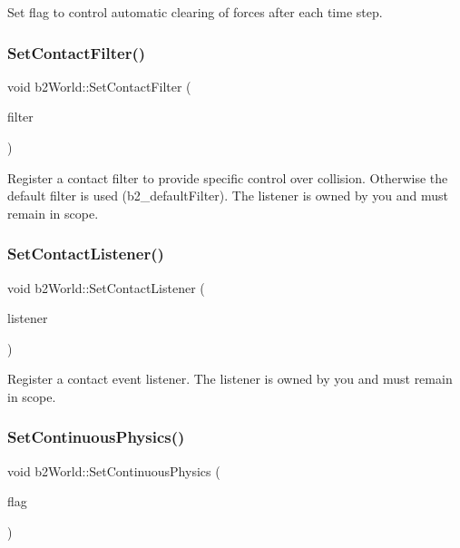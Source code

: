 Set flag to control automatic clearing of forces after each time step. 

\mbox{\label{classb2_world_a85e6e1e911c7d6366f8c7d57a12b72ff}} 
\subsubsection{\texorpdfstring{SetContactFilter()}{SetContactFilter()}}
{\footnotesize\ttfamily void b2\+World\+::\+Set\+Contact\+Filter (\begin{DoxyParamCaption}\item[{\mbox{\hyperlink{classb2_contact_filter}{b2\+Contact\+Filter}} $\ast$}]{filter }\end{DoxyParamCaption})}

Register a contact filter to provide specific control over collision. Otherwise the default filter is used (b2\+\_\+default\+Filter). The listener is owned by you and must remain in scope. \mbox{\label{classb2_world_a614549967fb8a1584b61c11e2d553d42}} 
\subsubsection{\texorpdfstring{SetContactListener()}{SetContactListener()}}
{\footnotesize\ttfamily void b2\+World\+::\+Set\+Contact\+Listener (\begin{DoxyParamCaption}\item[{\mbox{\hyperlink{classb2_contact_listener}{b2\+Contact\+Listener}} $\ast$}]{listener }\end{DoxyParamCaption})}

Register a contact event listener. The listener is owned by you and must remain in scope. \mbox{\label{classb2_world_a536dd9181c2e20096073e3cfe2c8530a}} 
\subsubsection{\texorpdfstring{SetContinuousPhysics()}{SetContinuousPhysics()}}
{\footnotesize\ttfamily void b2\+World\+::\+Set\+Continuous\+Physics (\begin{DoxyParamCaption}\item[{bool}]{flag }\end{DoxyParamCaption})\hspace{0.3cm}{\ttfamily [inline]}}



